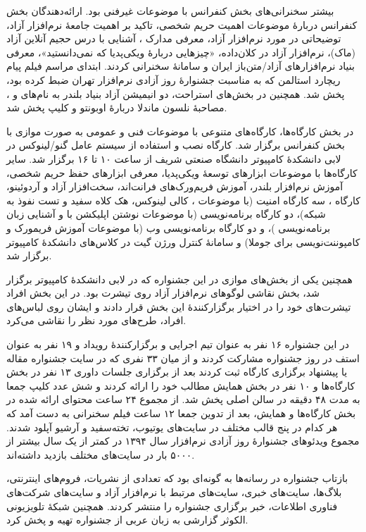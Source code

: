 \documentclass{article}
\begin{document}
بیشتر سخنرانی‌های بخش کنفرانس با موضوعات غیرفنی بود. ارائه‌دهندگان بخش کنفرانس دربارهٔ موضوعات اهمیت حریم شخصی، تاکید بر اهمیت جامعهٔ نرم‌افزار آزاد، توضیحاتی در مورد نرم‌افزار آزاد، معرفی مدارک ، آشنایی با درس حجیم آنلاین آزاد (ماک)، نرم‌افزار آزاد در کلان‌داده، «چیزهایی دربارهٔ ویکی‌پدیا که نمی‌دانستید»، معرفی بنیاد نرم‌افزارهای آزاد/متن‌باز ایران و سامانهٔ  سخنرانی کردند. ابتدای مراسم فیلم پیام ریچارد استالمن که به مناسبت جشنوارهٔ روز آزادی نرم‌افزار تهران ضبط کرده بود، پخش شد. همچنین در بخش‌‌های استراحت، دو انیمیشن آزاد بنیاد بلندر به نام‌های  و ، مصاحبهٔ نلسون ماندلا دربارهٔ اوبونتو و کلیپ  پخش شد.

در بخش کارگاه‌ها، کارگاه‌های متنوعی با موضوعات فنی و عمومی به صورت موازی با بخش کنفرانس برگزار شد. کارگاه نصب و استفاده از سیستم عامل گنو/لینوکس در لابی دانشکدهٔ کامپیوتر دانشگاه صنعتی شریف از ساعت ۱۰ تا ۱۶ برگزار شد. سایر کارگاه‌ها با موضوعات ابزارهای توسعهٔ ویکی‌پدیا، معرفی ابزارهای حفظ حریم شخصی، آموزش نرم‌افزار بلندر، آموزش فریم‌ورک‌های فرانت‌اند، سخت‌افزار آزاد و آردوئینو،  کارگاه ، سه کارگاه امنیت (با موضوعات ، کالی لینوکس، هک کلاه سفید و تست نفوذ به شبکه)،  دو کارگاه برنامه‌نویسی (با موضوعات نوشتن اپلیکشن با  و آشنایی زبان برنامه‌نویسی )، و دو کارگاه برنامه‌نویسی وب (با موضوعات آموزش فریمورک  و کامپوننت‌نویسی برای جوملا) و سامانهٔ کنترل ورژن گیت در کلاس‌های دانشکدهٔ کامپیوتر برگزار شد.

همچنین یکی از بخش‌های موازی در این جشنواره که در لابی دانشکدهٔ کامپیوتر برگزار شد، بخش نقاشی لوگوهای نرم‌افزار آزاد روی تیشرت بود. در این بخش افراد تیشرت‌های خود را در اختیار برگزارکنندهٔ این بخش قرار دادند و ایشان روی لباس‌های افراد، طرح‌های مورد نظر را نقاشی می‌کرد.

در این جشنواره ۱۶ نفر به عنوان تیم اجرایی و برگزارکنندهٔ رویداد و ۱۹ نفر به عنوان استف در روز جشنواره مشارکت کردند و از میان ۳۳ نفری که در سایت جشنواره مقاله یا پیشنهاد برگزاری کارگاه ثبت کردند بعد از برگزاری جلسات داوری ۱۳ نفر در بخش کارگاه‌ها و ۱۰ نفر در بخش همایش مطالب خود را ارائه کردند و شش عدد کلیپ جمعا به مدت ۴۸ دقیقه در سالن اصلی پخش شد. از مجموع ۲۴ ساعت محتوای ارائه شده در بخش کارگاه‌ها و همایش، بعد از تدوین جمعا ۱۲ ساعت فیلم سخنرانی به دست آمد که هر کدام در پنج قالب مختلف در سایت‌های یوتیوب، تخته‌سفید و آرشیو آپلود شدند. مجموع ویدئوهای جشنوارهٔ روز آزادی نرم‌افزار سال ۱۳۹۴ در کمتر از یک سال بیشتر از ۵۰۰۰ بار در سایت‌های مختلف بازدید داشته‌اند.

بازتاب جشنواره در رسانه‌ها به گونه‌ای بود که تعدادی از نشریات، فروم‌های اینترنتی، بلاگ‌ها، سایت‌های خبری، سایت‌های مرتبط با نرم‌افزار آزاد و سایت‌های شرکت‌های فناوری اطلاعات، خبر برگزاری جشنواره را منتشر کردند. همچنین شبکهٔ تلویزیونی الکوثر گزارشی به زبان عربی از جشنواره تهیه و پخش کرد.
\end{document}
